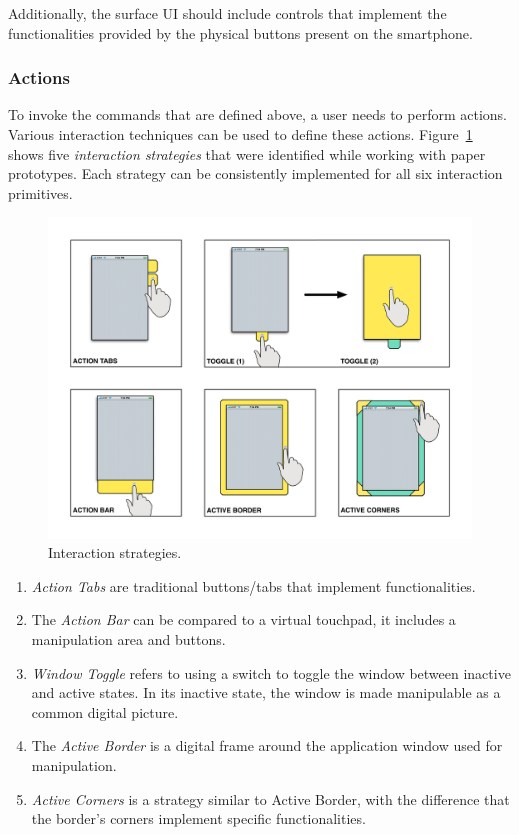 Additionally, the surface UI should include controls that implement the functionalities provided by the physical buttons present on the smartphone.

\subsubsection{Actions}

To invoke the commands that are defined above, a user needs to perform actions.
Various interaction techniques can be used to define these actions.
Figure~\ref{strategies} shows five \emph{interaction strategies} that were identified while working with paper prototypes.
Each strategy can be consistently implemented for all six interaction primitives.

\begin{figure}[htb]
\centering
\includegraphics[width=1\linewidth]{images/strategies}
\caption{Interaction strategies.}
\label{strategies}
\end{figure}

\begin{enumerate}
\item{\emph{Action Tabs} are traditional buttons/tabs that implement functionalities.}
\item{The \emph{Action Bar} can be compared to a virtual touchpad, it includes a manipulation area and buttons.}
\item{\emph{Window Toggle} refers to using a switch to toggle the window between inactive and active states. In its inactive state, the window is made manipulable as a common digital picture.}
\item{The \emph{Active Border} is a digital frame around the application window used for manipulation.}
\item{\emph{Active Corners} is a strategy similar to Active Border, with the difference that the border's corners implement specific functionalities.}
\end{enumerate}

